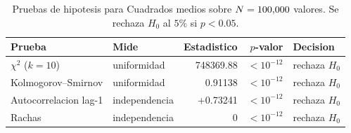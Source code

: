 \begin{table}[htbp]\centering
\caption{Pruebas de hipotesis para Cuadrados medios sobre $N=100{,}000$ valores. Se rechaza $H_0$ al $5\%$ si $p<0.05$.}
\label{tab:pruebasCM}
\small
\begin{tabular}{l|l|r|r|l}
\toprule
Prueba & Mide & Estadistico & $p$-valor & Decision \\
\midrule
$\chi^2$ ($k=10$) & uniformidad & 748369.88 & $<10^{-12}$ & rechaza $H_0$ \\
Kolmogorov--Smirnov & uniformidad & 0.91138 & $<10^{-12}$ & rechaza $H_0$ \\
Autocorrelacion lag-1 & independencia & +0.73241 & $<10^{-12}$ & rechaza $H_0$ \\
Rachas & independencia & 0 & $<10^{-12}$ & rechaza $H_0$ \\
\bottomrule
\end{tabular}
\end{table}
